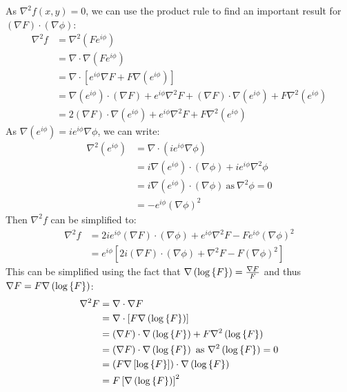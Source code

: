 \documentclass{article}
\begin{document}
As $\nabla^2 f(x,y) = 0$, we can use the product rule to find an important
result for $\left(\nabla F\right) \cdot \left(\nabla \phi\right)$:
\begin{align}
    \nabla^2 f &= \nabla^2 \left( F e^{i \phi} \right) \\
               &= \nabla \cdot \nabla \left( F e^{i \phi} \right) \\
               &= \nabla \cdot \left[ e^{i \phi} \nabla F + F \nabla \left( e^{i \phi} \right)
                  \right] \\
               &= \nabla \left( e^{i \phi} \right) \cdot (\nabla F) + e^{i \phi}
                  \nabla^2 F + \left( \nabla F \right) \cdot \nabla \left( e^{i \phi} \right)
                  + F \nabla^2 \left( e^{i \phi} \right) \\
               &= 2 \left( \nabla F \right) \cdot \nabla \left( e^{i \phi}
                  \right) + e^{i \phi} \nabla^2 F + F \nabla^2 \left( e^{i \phi}
                  \right)
\end{align}
As $\nabla \left( e^{i \phi} \right) = i e^{i \phi} \nabla \phi$, we can write:
\begin{align}
    \nabla^2 \left( e^{i \phi} \right) &= \nabla \cdot \left(i e^{i \phi} \nabla
        \phi \right) \\
    &= i \nabla \left( e^{i \phi} \right) \cdot (\nabla \phi) + i e^{i \phi}
        \nabla^2 \phi \\
    &= i \nabla \left( e^{i \phi} \right) \cdot (\nabla \phi) ~\textrm{as}~
        \nabla^2 \phi = 0 \\
    &= - e^{i \phi} \left( \nabla \phi \right)^2
\end{align}
Then $\nabla^2 f$ can be simplified to:
\begin{align}
    \nabla^2 f &= 2i e^{i \phi} \left( \nabla F \right) \cdot \left( \nabla \phi
        \right) + e^{i \phi} \nabla^2 F - F e^{i \phi} \left( \nabla \phi \right)^2 \\
    &= e^{i \phi} \left[ 2i (\nabla F) \cdot (\nabla \phi) + \nabla^2 F - F
        \left( \nabla \phi \right)^2 \right]
\end{align}
This can be simplified using the fact that $\nabla \left( \log \left\{ F \right\} \right) =
\frac{\nabla F}{F}$ and thus $\nabla F = F \nabla \left( \log \left\{ F \right\} \right)$:
\begin{align}
    \nabla^2 F &= \nabla \cdot \nabla F \\
               &= \nabla \cdot \left[ F \nabla \left( \log \left\{ F \right\} \right) \right]
    \\
    &= \left( \nabla F \right) \cdot \nabla \left( \log \left\{ F \right\} \right) + F \nabla^2
    \left( \log \left\{ F \right\} \right) \\
    &= \left( \nabla F \right) \cdot \nabla \left( \log \left\{ F \right\} \right)
    ~\textrm{as}~ \nabla^2 \left( \log \left\{ F \right\} \right) = 0 \\
    &= \left( F \nabla \left[ \log \left\{ F \right\} \right] \right) \cdot \nabla \left(
    \log \left\{ F \right\} \right) \\
    &= F \left[ \nabla \left( \log \left\{ F \right\} \right) \right]^2
\end{align}
\end{document}
